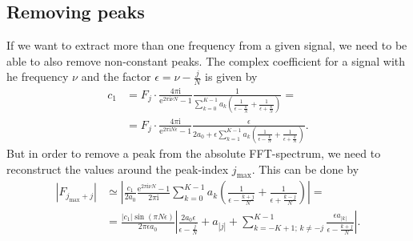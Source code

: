 \documentclass[english, parskip=full]{scrartcl}
\newcommand{\kla}{}
\newcommand{\klam}{}
\newcommand{\tecxt}{}
\renewcommand{\i}{\text{i}}
\newcommand{\e}{\text{e}}
\begin{document}
\subsection{Removing peaks}
If we want to extract more than one frequency from a given signal, we need to be able to also remove non-constant peaks.
The complex coefficient for a signal with he frequency $\nu$ and the factor $\epsilon = \nu - \frac{j}{N}$ is given by
\begin{align}
c_1 &= F_j\cdot \frac{4\pi\i}{\e^{2\pi\i\nu N} - 1} \frac{1}{\sum_{k=0}^{K-1} a_k \kla\left( \frac{1}{\epsilon - \frac{k}{N}} + \frac{1}{\epsilon + \frac{k}{N}} \right)} = \\
&= F_j\cdot \frac{4\pi\i}{\e^{2\pi\i N\epsilon} - 1} \frac{\epsilon}{2a_0 + \epsilon\sum_{k=1}^{K-1} a_k \kla\left( \frac{1}{\epsilon - \frac{k}{N}} + \frac{1}{\epsilon + \frac{k}{N}} \right)}.
\end{align}
But in order to remove a peak from the absolute FFT-spectrum, we need to reconstruct the values around the peak-index $j_\tecxt\text{max}$.
This can be done by
\begin{align}
|F_{j_\tecxt\text{max} + j}| &\simeq \left\vert \frac{c_1}{2a_0} \frac{\e^{2\pi\i \nu N} - 1}{2\pi\i} \sum_{k=0}^{K-1} a_k \kla\left( \frac{1}{\epsilon - \frac{k+j}{N}} + \frac{1}{\epsilon + \frac{k-j}{N}} \right) \right\vert = \\
&= \frac{|c_1|\sin( \pi N\epsilon) }{2\pi\epsilon a_0} \left\vert \frac{2a_0\epsilon}{\epsilon - \frac{j}{N}} + a_{|j|} + \sum_{k=-K+1;\, k\neq -j}^{K-1} \frac{\epsilon a_{|k|}}{\epsilon - \frac{k+j}{N}} \right\vert.
\end{align}



\end{document}
